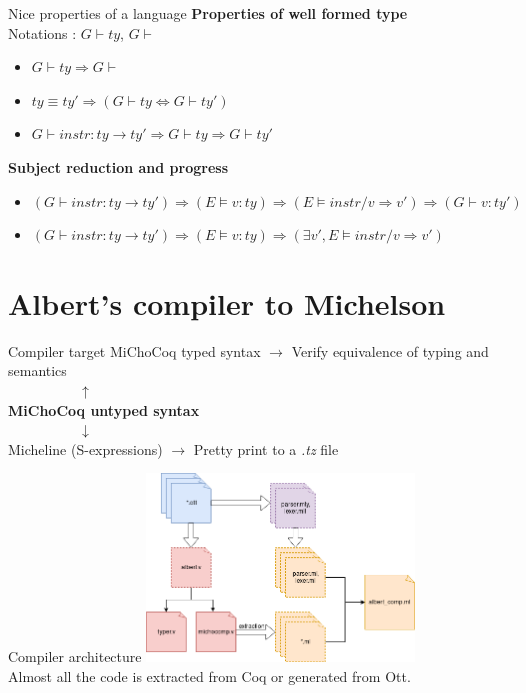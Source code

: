 \documentclass[aspectratio=169]{beamer}
\begin{document}
\begin{frame}{Nice properties of a language}
  \textbf{Properties of well formed type}\\
  Notations : $G \vdash ty$, $G \vdash$\\
  \begin{itemize}
    \item $G \vdash ty \Rightarrow G \vdash$
    \item $ty \equiv ty' \Rightarrow (G \vdash ty \Leftrightarrow G \vdash ty')$
    \item $G \vdash instr : ty \rightarrow ty' \Rightarrow G \vdash ty \Rightarrow G \vdash ty'$
  \end{itemize}

  \textbf{Subject reduction and progress}\\
  \begin{itemize}
    \item $(G \vdash instr : ty \rightarrow ty') \Rightarrow (E \models v : ty) \Rightarrow (E \models instr / v \Rightarrow v') \Rightarrow (G \vdash v : ty')$
    \item $(G \vdash instr : ty \rightarrow ty') \Rightarrow (E \models v : ty) \Rightarrow (\exists v', E \models instr / v \Rightarrow v')$
  \end{itemize}
\end{frame}

\section{Albert's compiler to Michelson}

\begin{frame}{Compiler target}
  MiChoCoq typed syntax $\rightarrow$ Verify equivalence of typing and semantics \\
  $\mspace{90mu} \uparrow $ \\
  \textbf{MiChoCoq untyped syntax} \\
  $\mspace{90mu} \downarrow $ \\
  Micheline (S-expressions) $\rightarrow$ Pretty print to a \textit{.tz} file
\end{frame}

\begin{frame}{Compiler architecture}
  \centering
  \includegraphics[height=5cm]{ressources/albert_comp.png}\\
  Almost all the code is extracted from Coq or generated from Ott.
\end{frame}
\end{document}
